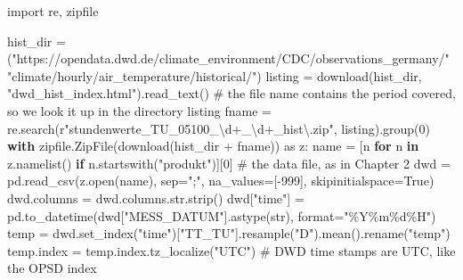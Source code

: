 \documentclass[
  letterpaper,
  DIV=11,
  numbers=noendperiod]{scrreprt}
\newenvironment{Shaded}{\begin{snugshade}}{\end{snugshade}}
\newcommand{\BuiltInTok}[1]{\textcolor[rgb]{0.00,0.23,0.31}{#1}}
\newcommand{\CommentTok}[1]{\textcolor[rgb]{0.37,0.37,0.37}{#1}}
\newcommand{\ControlFlowTok}[1]{\textcolor[rgb]{0.00,0.23,0.31}{\textbf{#1}}}
\newcommand{\DecValTok}[1]{\textcolor[rgb]{0.68,0.00,0.00}{#1}}
\newcommand{\ImportTok}[1]{\textcolor[rgb]{0.00,0.46,0.62}{#1}}
\newcommand{\KeywordTok}[1]{\textcolor[rgb]{0.00,0.23,0.31}{\textbf{#1}}}
\newcommand{\NormalTok}[1]{\textcolor[rgb]{0.00,0.23,0.31}{#1}}
\newcommand{\OperatorTok}[1]{\textcolor[rgb]{0.37,0.37,0.37}{#1}}
\newcommand{\SpecialCharTok}[1]{\textcolor[rgb]{0.37,0.37,0.37}{#1}}
\newcommand{\StringTok}[1]{\textcolor[rgb]{0.13,0.47,0.30}{#1}}
\newcommand{\VariableTok}[1]{\textcolor[rgb]{0.07,0.07,0.07}{#1}}
\newcommand{\VerbatimStringTok}[1]{\textcolor[rgb]{0.13,0.47,0.30}{#1}}
\begin{document}
\begin{tcolorbox}[enhanced jigsaw, left=2mm, title=\textcolor{quarto-callout-caution-color}{\faFire}\hspace{0.5em}{Solution to Exercise 2}, opacityback=0, breakable, rightrule=.15mm, arc=.35mm, toptitle=1mm, colbacktitle=quarto-callout-caution-color!10!white, opacitybacktitle=0.6, coltitle=black, colframe=quarto-callout-caution-color-frame, bottomrule=.15mm, leftrule=.75mm, bottomtitle=1mm, titlerule=0mm, toprule=.15mm, colback=white]

\begin{Shaded}
\begin{Highlighting}[]
\ImportTok{import}\NormalTok{ re, zipfile}

\NormalTok{hist\_dir }\OperatorTok{=}\NormalTok{ (}\StringTok{"https://opendata.dwd.de/climate\_environment/CDC/observations\_germany/"}
            \StringTok{"climate/hourly/air\_temperature/historical/"}\NormalTok{)}
\NormalTok{listing }\OperatorTok{=}\NormalTok{ download(hist\_dir, }\StringTok{"dwd\_hist\_index.html"}\NormalTok{).read\_text()}
\CommentTok{\# the file name contains the period covered, so we look it up in the directory listing}
\NormalTok{fname }\OperatorTok{=}\NormalTok{ re.search(}\VerbatimStringTok{r"stundenwerte\_TU\_05100\_\textbackslash{}d+\_\textbackslash{}d+\_hist\textbackslash{}.zip"}\NormalTok{, listing).group(}\DecValTok{0}\NormalTok{)}
\ControlFlowTok{with}\NormalTok{ zipfile.ZipFile(download(hist\_dir }\OperatorTok{+}\NormalTok{ fname)) }\ImportTok{as}\NormalTok{ z:}
\NormalTok{    name }\OperatorTok{=}\NormalTok{ [n }\ControlFlowTok{for}\NormalTok{ n }\KeywordTok{in}\NormalTok{ z.namelist() }\ControlFlowTok{if}\NormalTok{ n.startswith(}\StringTok{"produkt"}\NormalTok{)][}\DecValTok{0}\NormalTok{]   }\CommentTok{\# the data file, as in Chapter 2}
\NormalTok{    dwd }\OperatorTok{=}\NormalTok{ pd.read\_csv(z.}\BuiltInTok{open}\NormalTok{(name), sep}\OperatorTok{=}\StringTok{";"}\NormalTok{, na\_values}\OperatorTok{=}\NormalTok{[}\OperatorTok{{-}}\DecValTok{999}\NormalTok{], skipinitialspace}\OperatorTok{=}\VariableTok{True}\NormalTok{)}
\NormalTok{dwd.columns }\OperatorTok{=}\NormalTok{ dwd.columns.}\BuiltInTok{str}\NormalTok{.strip()}
\NormalTok{dwd[}\StringTok{"time"}\NormalTok{] }\OperatorTok{=}\NormalTok{ pd.to\_datetime(dwd[}\StringTok{"MESS\_DATUM"}\NormalTok{].astype(}\BuiltInTok{str}\NormalTok{), }\BuiltInTok{format}\OperatorTok{=}\StringTok{"\%Y\%m}\SpecialCharTok{\%d}\StringTok{\%H"}\NormalTok{)}
\NormalTok{temp }\OperatorTok{=}\NormalTok{ dwd.set\_index(}\StringTok{"time"}\NormalTok{)[}\StringTok{"TT\_TU"}\NormalTok{].resample(}\StringTok{"D"}\NormalTok{).mean().rename(}\StringTok{"temp"}\NormalTok{)}
\NormalTok{temp.index }\OperatorTok{=}\NormalTok{ temp.index.tz\_localize(}\StringTok{"UTC"}\NormalTok{)          }\CommentTok{\# DWD time stamps are UTC, like the OPSD index}


\end{Highlighting}
\end{Shaded}
\end{tcolorbox}
\end{document}
